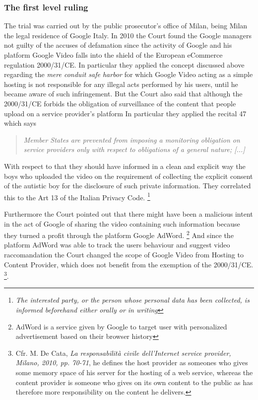 \documentclass[runningheads,a4paper]{llncs}
\begin{document}
\subsubsection{The first level ruling}
The trial was carried out by the public prosecutor's office of Milan, being Milan the legal residence of Google Italy\cite{NOTARI}. 
In 2010 the Court found the Google managers not guilty of the accuses of defamation since the activity of Google and his platform Google Video falls into the shield of the European eCommerce regulation 2000/31/CE. In particular they applied the concept discussed above regarding the \textit{mere conduit safe harbor} for which Google Video acting as a simple hosting is not responsible for any illegal acts performed by his users, until he became aware of such infringement.
But the Court also said that although the 2000/31/CE forbids the obligation of surveillance of the content that people upload on a service provider's platform
In particular they applied the recital 47 which says \begin{quote}
\textit{
 Member States are prevented from imposing a monitoring obligation on service providers only with respect to obligations of a general nature; [...]}
\end{quote}
With respect to that they should have informed in a clean and explicit way the boys who uploaded the video on the requirement of collecting the explicit consent of the autistic boy  for the disclosure of such private information. They correlated this to the Art 13 of the Italian Privacy Code. \footnote{\textit{The interested party, or the person whose personal data has been collected, is informed beforehand either orally or in writing}}

Furthermore the Court pointed out that there might have been a malicious intent in the act of Google of sharing the video containing such information because they turned a profit through the platform Google AdWord. 
\footnote{AdWord is a service given by Google to target user with personalized advertisement based on their browser history} 
And since the platform AdWord was able to track the users behaviour and suggest video raccomandation the Court changed the scope of Google Video from Hosting to Content Provider, which does not benefit from the exemption of the 2000/31/CE. 
\footnote{
Cfr. M. De Cata, \textit{La responsabilità civile dell'Internet service provider, Milano, 2010, pp. 70-71}, he defines the host provider as someones who gives some memory space of his server for the hosting of a web service, whereas the content provider is someone who gives on its own content to the public as has therefore more responsibility on the content he delivers. 
}.
\end{document}
